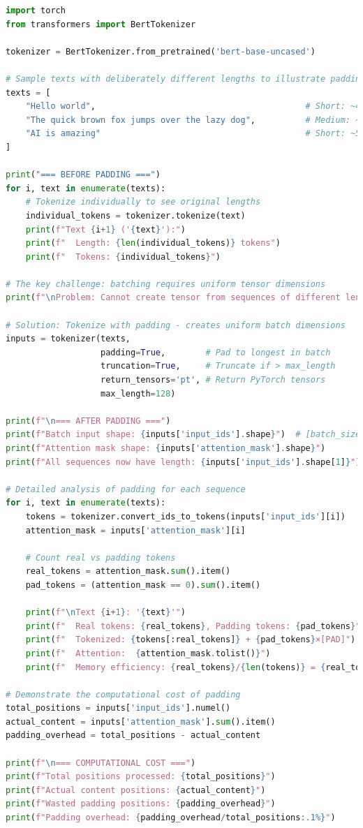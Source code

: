 \begin{lstlisting}[language=Python, caption={Padding implementation with batch processing analysis}]
import torch
from transformers import BertTokenizer

tokenizer = BertTokenizer.from_pretrained('bert-base-uncased')

# Sample texts with deliberately different lengths to illustrate padding
texts = [
    "Hello world",                                          # Short: ~4 tokens
    "The quick brown fox jumps over the lazy dog",          # Medium: ~12 tokens  
    "AI is amazing"                                         # Short: ~5 tokens
]

print("=== BEFORE PADDING ===")
for i, text in enumerate(texts):
    # Tokenize individually to see original lengths
    individual_tokens = tokenizer.tokenize(text)
    print(f"Text {i+1} ('{text}'):")
    print(f"  Length: {len(individual_tokens)} tokens")
    print(f"  Tokens: {individual_tokens}")

# The key challenge: batching requires uniform tensor dimensions
print(f"\nProblem: Cannot create tensor from sequences of different lengths!")

# Solution: Tokenize with padding - creates uniform batch dimensions
inputs = tokenizer(texts, 
                   padding=True,        # Pad to longest in batch
                   truncation=True,     # Truncate if > max_length
                   return_tensors='pt', # Return PyTorch tensors
                   max_length=128)

print(f"\n=== AFTER PADDING ===")
print(f"Batch input shape: {inputs['input_ids'].shape}")  # [batch_size, seq_len]
print(f"Attention mask shape: {inputs['attention_mask'].shape}")
print(f"All sequences now have length: {inputs['input_ids'].shape[1]}")

# Detailed analysis of padding for each sequence
for i, text in enumerate(texts):
    tokens = tokenizer.convert_ids_to_tokens(inputs['input_ids'][i])
    attention_mask = inputs['attention_mask'][i]
    
    # Count real vs padding tokens
    real_tokens = attention_mask.sum().item()
    pad_tokens = (attention_mask == 0).sum().item()
    
    print(f"\nText {i+1}: '{text}'")
    print(f"  Real tokens: {real_tokens}, Padding tokens: {pad_tokens}")
    print(f"  Tokenized: {tokens[:real_tokens]} + {pad_tokens}×[PAD]")
    print(f"  Attention:  {attention_mask.tolist()}")
    print(f"  Memory efficiency: {real_tokens}/{len(tokens)} = {real_tokens/len(tokens):.1%}")

# Demonstrate the computational cost of padding
total_positions = inputs['input_ids'].numel()
actual_content = inputs['attention_mask'].sum().item()
padding_overhead = total_positions - actual_content

print(f"\n=== COMPUTATIONAL COST ===")
print(f"Total positions processed: {total_positions}")
print(f"Actual content positions: {actual_content}")
print(f"Wasted padding positions: {padding_overhead}")
print(f"Padding overhead: {padding_overhead/total_positions:.1%}")
\end{lstlisting}

